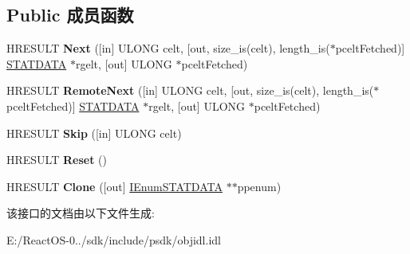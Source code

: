 \subsection*{Public 成员函数}
\begin{DoxyCompactItemize}
\item 
\mbox{\label{interface_i_enum_s_t_a_t_d_a_t_a_aa388581f5f3928b530901a3aa0d4d25a}} 
H\+R\+E\+S\+U\+LT {\bfseries Next} (\mbox{[}in\mbox{]} U\+L\+O\+NG celt, \mbox{[}out, size\+\_\+is(celt), length\+\_\+is($\ast$pcelt\+Fetched)\mbox{]} \hyperlink{struct_i_enum_s_t_a_t_d_a_t_a_1_1tag_s_t_a_t_d_a_t_a}{S\+T\+A\+T\+D\+A\+TA} $\ast$rgelt, \mbox{[}out\mbox{]} U\+L\+O\+NG $\ast$pcelt\+Fetched)
\item 
\mbox{\label{interface_i_enum_s_t_a_t_d_a_t_a_a6cd4e480141a93cb1cb7601d2dff3bca}} 
H\+R\+E\+S\+U\+LT {\bfseries Remote\+Next} (\mbox{[}in\mbox{]} U\+L\+O\+NG celt, \mbox{[}out, size\+\_\+is(celt), length\+\_\+is($\ast$pcelt\+Fetched)\mbox{]} \hyperlink{struct_i_enum_s_t_a_t_d_a_t_a_1_1tag_s_t_a_t_d_a_t_a}{S\+T\+A\+T\+D\+A\+TA} $\ast$rgelt, \mbox{[}out\mbox{]} U\+L\+O\+NG $\ast$pcelt\+Fetched)
\item 
\mbox{\label{interface_i_enum_s_t_a_t_d_a_t_a_a44b4f3093b3e43ecf0dec4889a75ad87}} 
H\+R\+E\+S\+U\+LT {\bfseries Skip} (\mbox{[}in\mbox{]} U\+L\+O\+NG celt)
\item 
\mbox{\label{interface_i_enum_s_t_a_t_d_a_t_a_a7c6038a567b09789424c225c1e28146f}} 
H\+R\+E\+S\+U\+LT {\bfseries Reset} ()
\item 
\mbox{\label{interface_i_enum_s_t_a_t_d_a_t_a_abbdcf580312fbd9478009f4601a5e7cf}} 
H\+R\+E\+S\+U\+LT {\bfseries Clone} (\mbox{[}out\mbox{]} \hyperlink{interface_i_enum_s_t_a_t_d_a_t_a}{I\+Enum\+S\+T\+A\+T\+D\+A\+TA} $\ast$$\ast$ppenum)
\end{DoxyCompactItemize}


该接口的文档由以下文件生成\+:\begin{DoxyCompactItemize}
\item 
E\+:/\+React\+O\+S-\/0../sdk/include/psdk/objidl.\+idl\end{DoxyCompactItemize}
